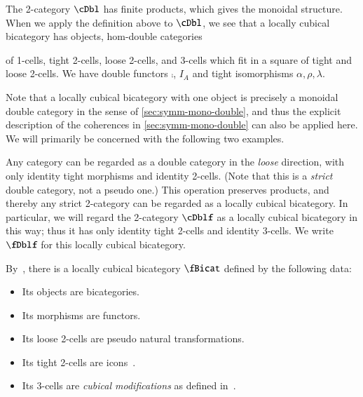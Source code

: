 The 2-category $\cDbl$ has finite products, which gives the monoidal structure. 
When we apply the definition above to $\cDbl$, we see that a locally cubical bicategory has objects, hom-double categories {of 1-cells, tight 2-cells, loose 2-cells, and 3-cells which fit in a square of tight and loose 2-cells. We have double functors $\comp$, $I_A$ and tight isomorphisms $\alpha, \rho, \lambda$.

Note that a locally cubical bicategory with one object is precisely a monoidal double category in the sense of \cref{sec:symm-mono-double}, and thus the explicit description of the coherences in \cref{sec:symm-mono-double} can also be applied here.
We will primarily be concerned with the following two examples.

\begin{eg}
  Any category can be regarded as a double category in the \emph{loose} direction, with only identity tight morphisms and identity 2-cells.
  (Note that this is a \emph{strict} double category, not a pseudo one.)
  This operation preserves products, and thereby any strict 2-category can be regarded as a locally cubical bicategory.
  In particular, we will regard the 2-category $\cDblf$ as a locally cubical bicategory in this way; thus it has only identity tight 2-cells and identity 3-cells. We write $\fDblf$ for this locally cubical bicategory.
\end{eg}

\begin{eg}
  By~\cite[Corollary 12]{gg:ldstr-tricat}, there is a locally cubical bicategory $\fBicat$ defined by the following data:
  \begin{itemize}
  \item Its objects are bicategories.
  \item Its morphisms are functors.
  \item Its loose 2-cells are pseudo natural transformations.
  \item Its tight 2-cells are icons~\cite{lack:icons}.
  \item Its 3-cells are \emph{cubical modifications} as defined in~\cite[Definition 13]{gg:ldstr-tricat}.
  \end{itemize}
\end{eg}

}

